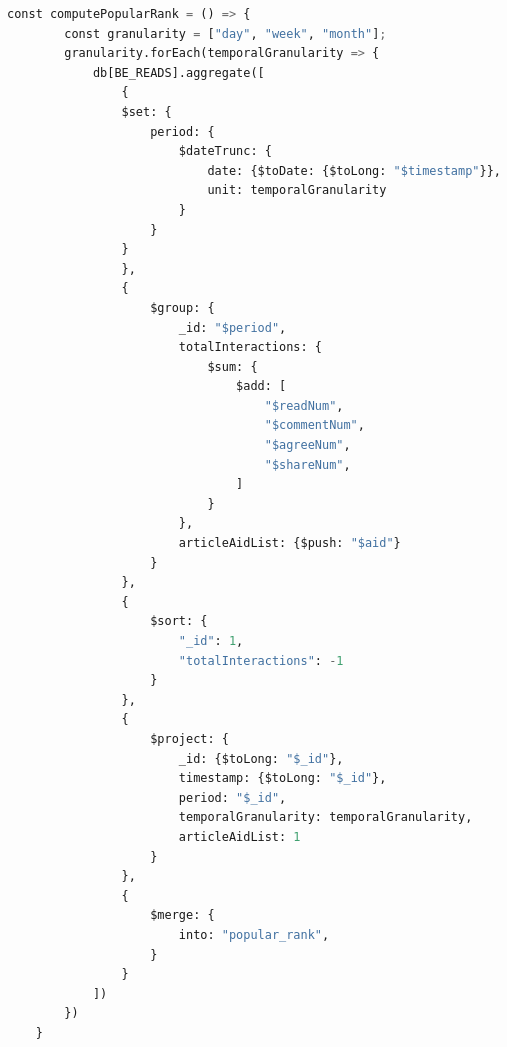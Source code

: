 \documentclass{article}
\begin{document}
    \begin{lstlisting}[language=Python, caption=Aggregation pipeline for generating Popular-Rank table]
    const computePopularRank = () => {
        const granularity = ["day", "week", "month"];
        granularity.forEach(temporalGranularity => {
            db[BE_READS].aggregate([
                {
                $set: {
                    period: {
                        $dateTrunc: {
                            date: {$toDate: {$toLong: "$timestamp"}},
                            unit: temporalGranularity
                        }
                    }
                }
                },
                {
                    $group: {
                        _id: "$period",
                        totalInteractions: {
                            $sum: {
                                $add: [
                                    "$readNum",
                                    "$commentNum",
                                    "$agreeNum",
                                    "$shareNum",
                                ]
                            }
                        },
                        articleAidList: {$push: "$aid"} 
                    }
                },
                {
                    $sort: {
                        "_id": 1,
                        "totalInteractions": -1
                    }
                },
                {
                    $project: {
                        _id: {$toLong: "$_id"},
                        timestamp: {$toLong: "$_id"},
                        period: "$_id",
                        temporalGranularity: temporalGranularity,
                        articleAidList: 1 
                    }
                },
                {
                    $merge: {
                        into: "popular_rank",
                    }
                }
            ])
        })
    }
    \end{lstlisting}
\end{document}
